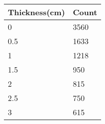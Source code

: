 \begin{table}[H]
    \centering
    \begin{tabular}{|l|l|}
    \hline
        Thickness(cm) & Count \\ \hline
        0 & 3560 \\ \hline
        0.5 & 1633 \\ \hline
        1 & 1218 \\ \hline
        1.5 & 950 \\ \hline
        2 & 815 \\ \hline
        2.5 & 750 \\ \hline
        3 & 615 \\ \hline
    \end{tabular}
\end{table}